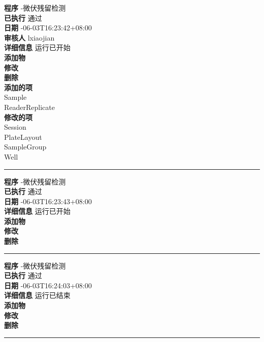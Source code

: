 \documentclass[UTF8,10pt,a4paper,fontset=fandol]{ctexart}
\begin{document}
\begin{flushleft}
\textbf{程序} -微伏残留检测\\
\textbf{已执行} \quad 通过\\
\textbf{日期} -06-03T16:23:42+08:00\\
\textbf{审核人} \quad lxiaojian\\
\textbf{详细信息} \quad 运行已开始\\[2pt]
\textbf{添加物} \\
\textbf{修改} \\
\textbf{删除} \\[2pt]
\textbf{添加的项}\\
\quad Sample\\
\quad ReaderReplicate\\[2pt]
\textbf{修改的项}\\
\quad Session\\
\quad PlateLayout\\
\quad SampleGroup\\
\quad Well
\end{flushleft}

\hrule

\begin{flushleft}
\textbf{程序} -微伏残留检测\\
\textbf{已执行} \quad 通过\\
\textbf{日期} -06-03T16:23:43+08:00\\
\textbf{详细信息} \quad 运行已开始\\[2pt]
\textbf{添加物} \\
\textbf{修改} \\
\textbf{删除} 
\end{flushleft}

\hrule

\begin{flushleft}
\textbf{程序} -微伏残留检测\\
\textbf{已执行} \quad 通过\\
\textbf{日期} -06-03T16:24:03+08:00\\
\textbf{详细信息} \quad 运行已结束\\[2pt]
\textbf{添加物} \\
\textbf{修改} \\
\textbf{删除} 
\end{flushleft}

\hrule
\end{document}
